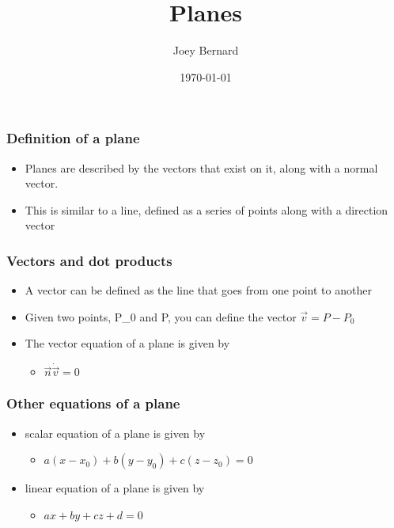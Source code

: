 \documentclass{beamer}
\title{Planes}
\author{Joey Bernard}
\institute{University of New Brunswick}
\date{\today}
\begin{document}
\begin{frame}
  \titlepage
\end{frame}

\begin{frame}
  \frametitle{Definition of a plane}
  \begin{itemize}
  \item Planes are described by the vectors that exist on it, along with a normal vector.
  \item This is similar to a line, defined as a series of points along with a direction vector
  \end{itemize}
\end{frame}

\begin{frame}
  \frametitle{Vectors and dot products}
  \begin{itemize}
  \item A vector can be defined as the line that goes from one point to another
  \item Given two points, P_0 and P, you can define the vector $\vec{v} = P - P_0$
  \item The vector equation of a plane is given by
    \begin{itemize}
    \item $\vec{n} \dot \vec{v} = 0$
    \end{itemize}
  \end{itemize}
\end{frame}

\begin{frame}
  \frametitle{Other equations of a plane}
  \begin{itemize}
  \item scalar equation of a plane is given by
    \begin{itemize}
    \item $a(x-x_0) + b(y-y_0) + c(z-z_0) = 0$
    \end{itemize}
  \item linear equation of a plane is given by
    \begin{itemize}
    \item $ax + by + cz + d = 0$
    \end{itemize}
  \end{itemize}
\end{frame}
\end{document}
